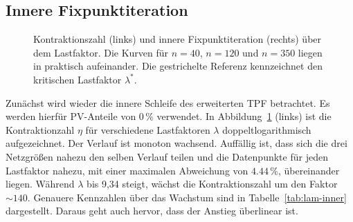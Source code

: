 %

\subsection{Innere Fixpunktiteration}
\label{subsec:lam-inner}


\begin{figure}[htbp]
	\centering
	
	\caption{Kontraktionszahl (links) und innere Fixpunktiteration (rechts) über dem Lastfaktor. Die Kurven für
		$n=40$, $n=120$ und $n=350$ liegen in praktisch aufeinander. Die
		gestrichelte Referenz kennzeichnet den kritischen Lastfaktor
		$\lambda^\ast$.}
	\label{fig:e1_inner_convergence}
\end{figure}


Zunächst wird wieder die innere Schleife des erweiterten TPF betrachtet.
Es werden hierfür PV-Anteile von $0\,\%$ verwendet.
In Abbildung~\ref{fig:e1_inner_convergence} (links) ist die Kontraktionzahl $\eta$ für verschiedene Lastfaktoren $\lambda$ doppeltlogarithmisch aufgezeichnet.
Der Verlauf ist monoton wachsend. 
Auffällig ist, dass sich die drei Netzgrößen nahezu den selben Verlauf teilen und die Datenpunkte für jeden Lastfaktor nahezu, mit einer maximalen Abweichung von $4.44\,\%$, übereinander liegen.
Während $\lambda$ bis 9,34 steigt, wächst die Kontraktionszahl um den Faktor $\sim140$.
Genauere Kennzahlen über das Wachstum sind in Tabelle~\ref{tab:lam-inner} dargestellt.
Daraus geht auch hervor, dass der Anstieg überlinear ist.

